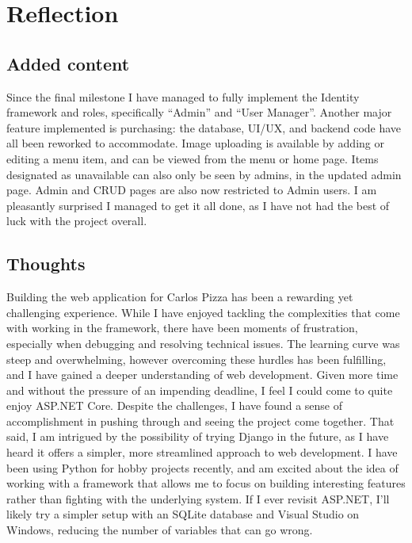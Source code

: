\documentclass{article}
\begin{document}
\section{Reflection}
\subsection{Added content}
Since the final milestone I have managed to fully implement the Identity framework and roles, specifically ``Admin'' and ``User Manager''. Another major feature implemented is purchasing: the database, UI/UX, and backend code have all been reworked to accommodate. Image uploading is available by adding or editing a menu item, and can be viewed from the menu or home page. Items designated as unavailable can also only be seen by admins, in the updated admin page. Admin and CRUD pages are also now restricted to Admin users. I am pleasantly surprised I managed to get it all done, as I have not had the best of luck with the project overall.

\subsection{Thoughts}
Building the web application for Carlos Pizza has been a rewarding yet challenging experience. While I have enjoyed tackling the complexities that come with working in the framework, there have been moments of frustration, especially when debugging and resolving technical issues. The learning curve was steep and overwhelming, however overcoming these hurdles has been fulfilling, and I have gained a deeper understanding of web development. Given more time and without the pressure of an impending deadline, I feel I could come to quite enjoy ASP.NET Core. Despite the challenges, I have found a sense of accomplishment in pushing through and seeing the project come together. That said, I am intrigued by the possibility of trying Django in the future, as I have heard it offers a simpler, more streamlined approach to web development. I have been using Python for hobby projects recently, and am excited about the idea of working with a framework that allows me to focus on building interesting features rather than fighting with the underlying system. If I ever revisit ASP.NET, I'll likely try a simpler setup with an SQLite database and Visual Studio on Windows, reducing the number of variables that can go wrong.
\end{document}
